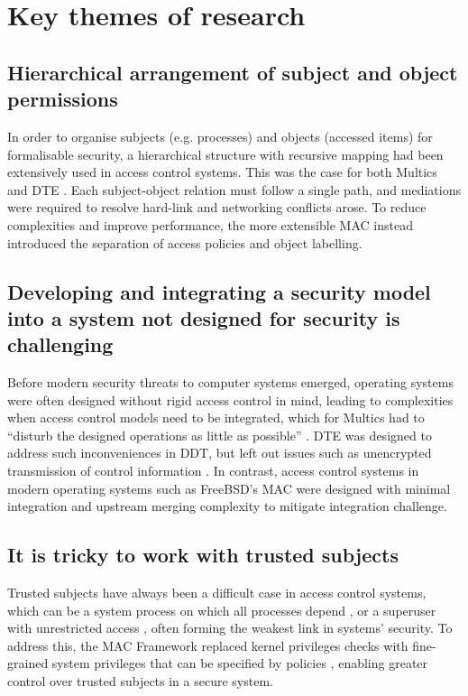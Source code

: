 \documentclass[11pt]{article}
\begin{document}
\section{Key themes of research}

\subsection{Hierarchical arrangement of subject and object permissions}

In order to organise subjects (e.g. processes) and objects (accessed items) for formalisable security, a hierarchical structure with recursive mapping \cite[p. 36]{bell1976secure} had been extensively used in access control systems. This was the case for both Multics \cite[p. 12]{bell1976secure} and DTE \cite[pp. 52-55]{badger1996domain}. Each subject-object relation must follow a single path, and mediations were required to resolve hard-link and networking conflicts arose. To reduce complexities and improve performance, the more extensible MAC \cite[p. 57]{watson2013decade} instead introduced the separation of access policies and object labelling.

\subsection{Developing and integrating a security model into a system not designed for security is challenging}

Before modern security threats to computer systems emerged, operating systems were often designed without rigid access control in mind, leading to complexities when access control models need to be integrated, which for Multics had to ``disturb the designed operations as little as possible'' \cite[p. 25]{bell1976secure}. DTE was designed to address such inconveniences in DDT, but left out issues such as unencrypted transmission of control information \cite[pp. 60-61]{badger1996domain}. In contrast, access control systems in modern operating systems such as FreeBSD's MAC were designed with minimal integration and upstream merging complexity \cite[p. 58]{watson2013decade} to mitigate integration challenge.

\subsection{It is tricky to work with trusted subjects}

Trusted subjects have always been a difficult case in access control systems, which can be a system process on which all processes depend \cite[p. 67]{bell1976secure} \cite[p. 48]{badger1996domain}, or a superuser with unrestricted access \cite[p. 60]{watson2013decade}, often forming the weakest link in systems' security. To address this, the MAC Framework replaced kernel privileges checks with fine-grained system privileges that can be specified by policies \cite[p. 59]{watson2013decade}, enabling greater control over trusted subjects in a secure system. 
 
\end{document}
